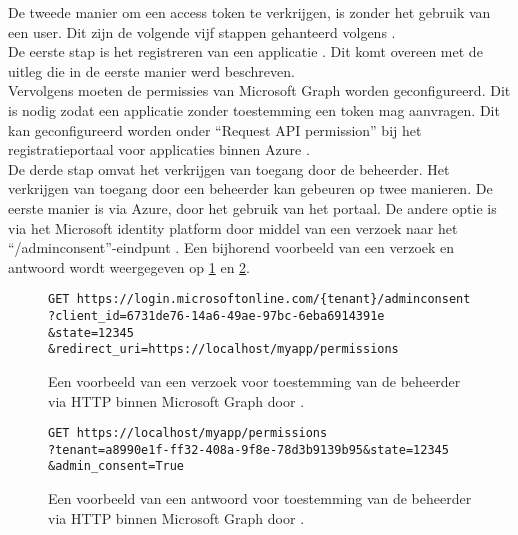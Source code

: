 De tweede manier om een access token te verkrijgen, is zonder het gebruik van een user. Dit zijn de volgende vijf stappen gehanteerd volgens \textcite{Microsoft2023s}. \\

De eerste stap is het registreren van een applicatie \autocite{Microsoft2023s}. Dit komt overeen met de uitleg die in de eerste manier werd beschreven. \\

Vervolgens moeten de permissies van Microsoft Graph worden geconfigureerd. Dit is nodig zodat een applicatie zonder toestemming een token mag aanvragen. Dit kan geconfigureerd worden onder “Request \ac{API} permission” bij het registratieportaal voor applicaties binnen Azure \autocite{Microsoft2023s}. \\

De derde stap omvat het verkrijgen van toegang door de beheerder. Het verkrijgen van toegang door een beheerder kan gebeuren op twee manieren. De eerste manier is via Azure, door het gebruik van het portaal. De andere optie is via het Microsoft identity platform door middel van een verzoek naar het “/adminconsent”-eindpunt \autocite{Microsoft2023s}. Een bijhorend voorbeeld van een verzoek en antwoord wordt weergegeven op \ref{MSGRAR} en \ref{MSGRARES}. \\

\begin{figure}[!h]
    \scriptsize
    \begin{verbatim}
GET https://login.microsoftonline.com/{tenant}/adminconsent
?client_id=6731de76-14a6-49ae-97bc-6eba6914391e
&state=12345
&redirect_uri=https://localhost/myapp/permissions
    \end{verbatim}    
    \caption[Voorbeeld “/adminconsent” request Microsoft Graph]{Een voorbeeld van een verzoek voor toestemming van de beheerder via \ac{HTTP} binnen Microsoft Graph door \textcite{Microsoft2023s}.}
    \label{MSGRAR}
\end{figure}

\begin{figure}[!h]
    \scriptsize
    \begin{verbatim}
GET https://localhost/myapp/permissions
?tenant=a8990e1f-ff32-408a-9f8e-78d3b9139b95&state=12345
&admin_consent=True
    \end{verbatim}    
    \caption[Voorbeeld “/adminconsent” response Microsoft Graph]{Een voorbeeld van een antwoord voor toestemming van de beheerder via \ac{HTTP} binnen Microsoft Graph door \textcite{Microsoft2023s}.}
    \label{MSGRARES}
\end{figure}

